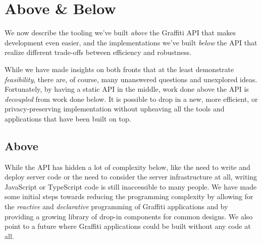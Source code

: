 \section{Above & Below}

We now describe the tooling we've built \emph{above}
the Graffiti API that makes development even easier, and
the implementations we've built \emph{below} the API
that realize different trade-offs between efficiency and
robustness.

While we have made insights on both fronts that at
the least demonstrate \emph{feasibility},
there are, of course,
many unanswered questions and unexplored ideas.
Fortunately, by having a static API in the middle, work done above the API
is \emph{decoupled} from work done below.
It is possible to drop in a new, more efficient, or privacy-preserving implementation
without upheaving all the tools and applications that have been built on top.


\subsection{Above}

While the API has hidden a lot of complexity below,
like the need to write and deploy server code or the need to
consider the server infrastructure at all,
writing JavaScript or TypeScript code is still inaccessible
to many people.
We have made some initial steps towards reducing the
programming complexity by allowing for the \emph{reactive} and
\emph{declarative} programming of Graffiti applications
and by providing a growing library of drop-in components for common designs.
We also point to a future where Graffiti applications could be built
without any code at all.

